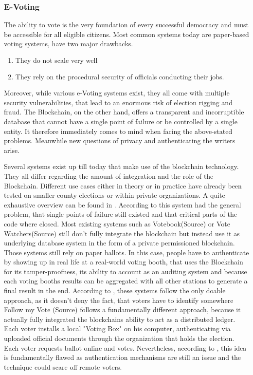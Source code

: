 \subsubsection{E-Voting}
The ability to vote is the very foundation of every successful democracy and must be accessible for all eligible citizens. Most common systems today are paper-based voting systems, have two major drawbacks.
\begin{enumerate}
    \item They do not scale very well
    \item They rely on the procedural security of officials conducting their jobs.
\end{enumerate}

Moreover, while various e-Voting systems exist, they all come with multiple security vulnerabilities, that lead to an enormous risk of election rigging and fraud.
The Blockchain, on the other hand, offers a transparent and incorruptible database that cannot have a single point of failure or be controlled by a single entity. It therefore immediately comes to mind when facing the above-stated problems. Meanwhile new questions of privacy and authenticating the writers arise.

Several systems exist up till today that make use of the blockchain technology. They all differ regarding the amount of integration and the role of the Blockchain. Different use cases either in theory or in practice have already been tested on smaller county elections or within private organizations. A quite exhaustive overview can be found in \cite{BenAyed2017}. According to \citeauthor{BenAyed2017} this system had the general problem, that single points of failure still existed and that critical parts of the code where closed.
Most existing systems such as Votebook(Source) or Vote Watchers(Source) still don't fully integrate the blockchain but instead use it as underlying database system in the form of a private permissioned blockchain. Those systems still rely on paper ballots. In this case, people have to authenticate by showing up in real life at a real-world voting booth, that uses the Blockchain for its tamper-proofness, its ability to account as an auditing system and because each voting booths results can be aggregated with all other stations to generate a final result in the end.
According to \citeauthor{Osgood2016}, these systems follow the only doable approach, as it doesn't deny the fact, that voters have to identify somewhere
Follow my Vote (Source) follows a fundamentally different approach, because it actually fully integrated the blockchains ability to act as a distributed ledger. Each voter installs a local "Voting Box" on his computer, authenticating via uploaded official documents through the organization that holds the election. Each voter requests ballot online and votes. Nevertheless, according to \citeauthor{Osgood2016}, this idea is fundamentally flawed as authentication mechanisms are still an issue and the technique could scare off remote voters.

